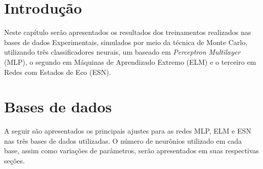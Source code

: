 
\section*{Introdução}

Neste capítulo serão apresentados os resultados dos treinamentos realizados nas bases de dados Experimentais, simulados por meio da técnica de Monte Carlo, utilizando três classificadores neurais, um baseado em \textit{Perceptron Multilayer} (MLP), o segundo em Máquinas de Aprendizado Extremo (ELM) e o terceiro em Redes com Estados de Eco (ESN). 

\section{Bases de dados}

A seguir são apresentados os principais ajustes para as redes MLP, ELM e ESN nas três bases de dados utilizadas. O número de neurônios utilizado em cada base, assim como variações de parâmetros, serão apresentados em suas respectivas seções. 


